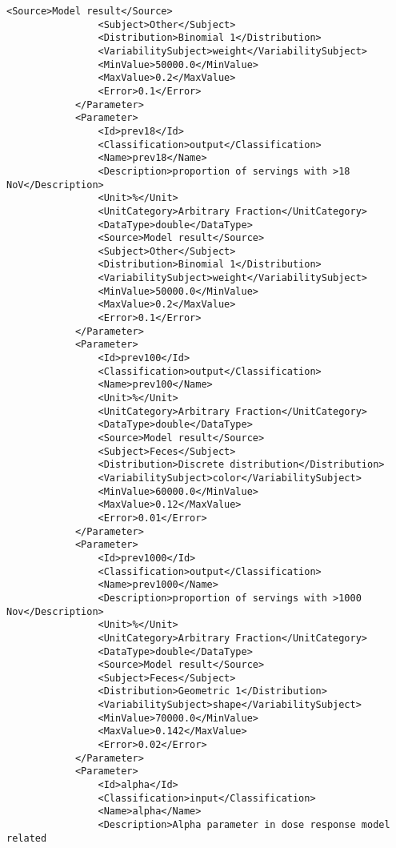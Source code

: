 \documentclass[a4paper]{report}
\begin{document}
\begin{lstlisting}[language=RAKIP, caption={Example of StudySample}]
                <Source>Model result</Source>
                <Subject>Other</Subject>
                <Distribution>Binomial 1</Distribution>
                <VariabilitySubject>weight</VariabilitySubject>
                <MinValue>50000.0</MinValue>
                <MaxValue>0.2</MaxValue>
                <Error>0.1</Error>
            </Parameter>
            <Parameter>
                <Id>prev18</Id>
                <Classification>output</Classification>
                <Name>prev18</Name>
                <Description>proportion of servings with >18 NoV</Description>
                <Unit>%</Unit>
                <UnitCategory>Arbitrary Fraction</UnitCategory>
                <DataType>double</DataType>
                <Source>Model result</Source>
                <Subject>Other</Subject>
                <Distribution>Binomial 1</Distribution>
                <VariabilitySubject>weight</VariabilitySubject>
                <MinValue>50000.0</MinValue>
                <MaxValue>0.2</MaxValue>
                <Error>0.1</Error>
            </Parameter>
            <Parameter>
                <Id>prev100</Id>
                <Classification>output</Classification>
                <Name>prev100</Name>
                <Unit>%</Unit>
                <UnitCategory>Arbitrary Fraction</UnitCategory>
                <DataType>double</DataType>
                <Source>Model result</Source>
                <Subject>Feces</Subject>
                <Distribution>Discrete distribution</Distribution>
                <VariabilitySubject>color</VariabilitySubject>
                <MinValue>60000.0</MinValue>
                <MaxValue>0.12</MaxValue>
                <Error>0.01</Error>
            </Parameter>
            <Parameter>
                <Id>prev1000</Id>
                <Classification>output</Classification>
                <Name>prev1000</Name>
                <Description>proportion of servings with >1000 Nov</Description>
                <Unit>%</Unit>
                <UnitCategory>Arbitrary Fraction</UnitCategory>
                <DataType>double</DataType>
                <Source>Model result</Source>
                <Subject>Feces</Subject>
                <Distribution>Geometric 1</Distribution>
                <VariabilitySubject>shape</VariabilitySubject>
                <MinValue>70000.0</MinValue>
                <MaxValue>0.142</MaxValue>
                <Error>0.02</Error>
            </Parameter>
            <Parameter>
                <Id>alpha</Id>
                <Classification>input</Classification>
                <Name>alpha</Name>
                <Description>Alpha parameter in dose response model related

\end{lstlisting}
\end{document}
